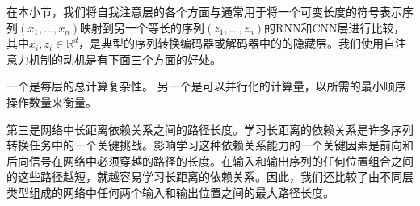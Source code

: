 

在本小节，我们将自我注意层的各个方面与通常用于将一个可变长度的符号表示序列$(x_1, ..., x_n)$映射到另一个等长的序列$(z_1, ..., z_n)$的RNN和CNN层进行比较，其中$x_i, z_i \in \mathbb{R}^d$，是典型的序列转换编码器或解码器中的的隐藏层。我们使用自注意力机制的动机是有下面三个方面的好处。


一个是每层的总计算复杂性。
另一个是可以并行化的计算量，以所需的最小顺序操作数量来衡量。



第三是网络中长距离依赖关系之间的路径长度。学习长距离的依赖关系是许多序列转换任务中的一个关键挑战。影响学习这种依赖关系能力的一个关键因素是前向和后向信号在网络中必须穿越的路径的长度。在输入和输出序列的任何位置组合之间的这些路径越短，就越容易学习长距离的依赖关系。因此，我们还比较了由不同层类型组成的网络中任何两个输入和输出位置之间的最大路径长度。


